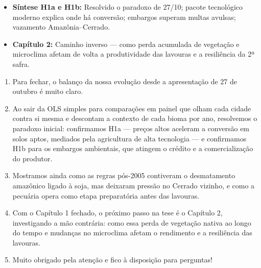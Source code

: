 \documentclass[11pt,a4paper]{article}
\begin{document}
\begin{tcolorbox}[title={\bfseries\small ÂNCORAS DO SLIDE}]
\begin{itemize}[leftmargin=*,itemsep=1mm,topsep=0.5mm]
    \item \textbf{Síntese H1a e H1b:} Resolvido o paradoxo de 27/10; pacote tecnológico moderno explica onde há conversão; embargos superam multas avulsas; vazamento Amazônia--Cerrado.
    \item \textbf{Capítulo 2:} Caminho inverso --- como perda acumulada de vegetação e microclima afetam de volta a produtividade das lavouras e a resiliência da 2ª safra.
\end{itemize}
\end{tcolorbox}
\vspace{2mm}

\vspace{1mm}
\begin{enumerate}[leftmargin=*,label=\textbf{(\arabic*)},itemsep=2.6mm,topsep=1mm]
    \item Para fechar, o balanço da nossa evolução desde a apresentação de 27 de outubro é muito claro.
    \item Ao sair da OLS simples para comparações em painel que olham cada cidade contra si mesma e descontam a contexto de cada bioma por ano, resolvemos o paradoxo inicial: confirmamos H1a — preços altos aceleram a conversão em solos aptos, mediados pela agricultura de alta tecnologia — e confirmamos H1b para os embargos ambientais, que atingem o crédito e a comercialização do produtor.
    \item Mostramos ainda como as regras pós-2005 contiveram o desmatamento amazônico ligado à soja, mas deixaram pressão no Cerrado vizinho, e como a pecuária opera como etapa preparatória antes das lavouras.
    \item Com o Capítulo 1 fechado, o próximo passo na tese é o Capítulo 2, investigando a mão contrária: como essa perda de vegetação nativa ao longo do tempo e mudanças no microclima afetam o rendimento e a resiliência das lavouras.
    \item Muito obrigado pela atenção e fico à disposição para perguntas!
\end{enumerate}

\newpage
\end{document}
